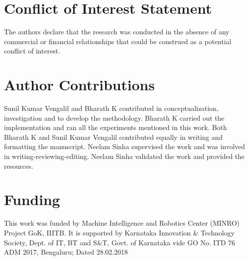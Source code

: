 \documentclass[utf8]{FrontiersinHarvard} %
\begin{document}
\section*{Conflict of Interest Statement}
The authors declare that the research was conducted in the absence of any commercial or financial relationships that could be construed as a potential conflict of interest.

\section*{Author Contributions}

Sunil Kumar Vengalil and Bharath K contributed in conceptualization, investigation and to develop the methodology. Bharath K carried out the implementation and ran all the experiments mentioned in this work. Both Bharath K and Sunil Kumar Vengalil contributed equally in writing and formatting the manuscript. Neelam Sinha supervised the work and was involved in writing-reviewing-editing. Neelam Sinha validated the work and provided the resources.

\section*{Funding}
This work was funded by Machine Intelligence and Robotics Center (MINRO) Project GoK, IIITB. It is supported by Karnataka Innovation \& Technology Society, Dept. of IT, BT and S\&T, Govt. of Karnataka vide GO No. ITD 76 ADM 2017, Bengaluru; Dated 28.02.2018

%
\end{document}
